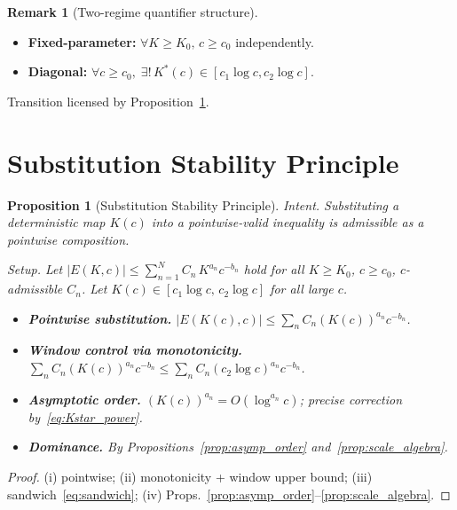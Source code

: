 \documentclass[12pt,a4paper]{amsart}
\newtheorem{proposition}[theorem]{Proposition}
\theoremstyle{definition}
\newtheorem{remark}[theorem]{Remark}
\begin{document}
\begin{remark}[Two-regime quantifier structure]
\label{rem:diagonal_regime}
\begin{itemize}[nosep]
  \item \textbf{Fixed-parameter:}
    $\forall K\geq K_0,\, c\geq c_0$ independently.
  \item \textbf{Diagonal:}
    $\forall c\geq c_0,\;\exists!\,K^*(c)\in[c_1\log c,c_2\log c]$.
\end{itemize}
Transition licensed by Proposition~\ref{prop:substitution_stability}.
\end{remark}

\section{Substitution Stability Principle}
\label{sec:substprin}

\begin{proposition}[Substitution Stability Principle]
\label{prop:substitution_stability}
\emph{Intent.}
Substituting a deterministic map $K(c)$ into a
pointwise-valid inequality is admissible as a pointwise composition.

\emph{Setup.}
Let $|E(K,c)| \leq \sum_{n=1}^N C_n\,K^{a_n}c^{-b_n}$
hold for all $K\geq K_0$, $c\geq c_0$, $c$-admissible $C_n$.
Let $K(c)\in[c_1\log c,\,c_2\log c]$ for all large $c$.

\begin{itemize}[nosep]
  \item[(i)] \textbf{Pointwise substitution.}
    $|E(K(c),c)|\leq\sum_n C_n(K(c))^{a_n}c^{-b_n}$.
  \item[(ii)] \textbf{Window control via monotonicity.}
    $\sum_n C_n (K(c))^{a_n} c^{-b_n}
      \leq \sum_n C_n (c_2\log c)^{a_n} c^{-b_n}$.
  \item[(iii)] \textbf{Asymptotic order.}
    $(K(c))^{a_n}=O(\log^{a_n}c)$;
    precise correction by~\eqref{eq:Kstar_power}.
  \item[(iv)] \textbf{Dominance.}
    By Propositions~\ref{prop:asymp_order} and~\ref{prop:scale_algebra}.
\end{itemize}
\end{proposition}

\begin{proof}
(i) pointwise; (ii) monotonicity + window upper bound;
(iii) sandwich~\eqref{eq:sandwich}; (iv) Props.~\ref{prop:asymp_order}--\ref{prop:scale_algebra}.
\end{proof}
\end{document}
